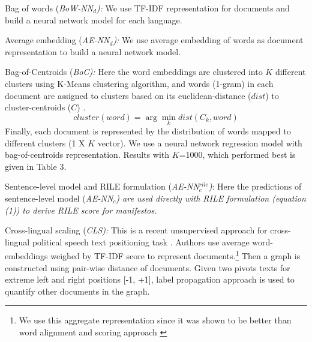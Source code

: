 \documentclass[11pt,a4paper]{article}
\newcommand{\argmin}{\arg\!\min}
\begin{document}
\begin{description}
\item{Bag of words (\em{BoW-NN$_{d}$}):} \rm We use TF-IDF representation for documents and build a neural network model  for each language.
\item{Average embedding (\em{AE-NN}$_{d}$):} We use average embedding of words as document representation to build a neural network model.

\item{Bag-of-Centroids (\em{BoC}):} Here the word embeddings are clustered into $K$ different clusters using K-Means clustering algorithm, and  words (1-gram) in each document are assigned to clusters based on its euclidean-distance ($dist$) to cluster-centroids ($C$) \cite{lebret2014n}. 
\[ cluster (word) = \argmin_k dist(C_{k}, word) \]
Finally, each document is represented by the distribution of words mapped to different clusters (1 X $K$ vector). We use a neural network regression model with bag-of-centroids representation. Results with $K$=1000, which performed best is given in Table 3.

\item{Sentence-level model and RILE formulation (\em{AE-NN}$_{c}^{rile}$)}: Here the predictions of sentence-level model (\em{AE-NN$_{c}$}) \rm are used directly with RILE formulation (equation (1)) to derive RILE score for manifestos.

\item{Cross-lingual scaling (\em{CLS}):} This is a recent unsupervised approach for cross-lingual political speech text positioning task \cite{EACL}. Authors use average word-embeddings weighed by TF-IDF score to represent documents.\footnote{We use this aggregate representation since it was shown to be better than word alignment and scoring approach \cite{EACL}} Then a graph is constructed using pair-wise distance of documents. Given two pivots texts for extreme left and right positions [-1, +1], label propagation approach is used to quantify other documents in the graph.
\end{description}
\end{document}
